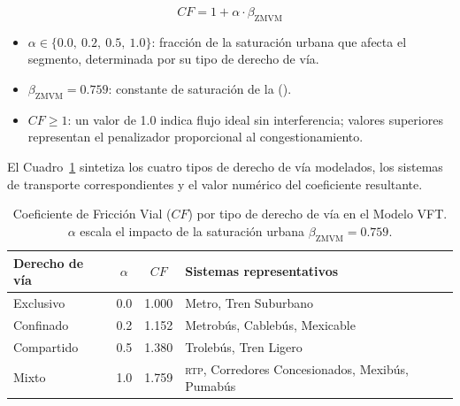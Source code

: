 \begin{equation}
    CF = 1 + \alpha \cdot \beta_{\text{ZMVM}}
    \label{eq:cf-formula}
\end{equation}

\begin{itemize}
    \item $\alpha \in \{0.0,\ 0.2,\ 0.5,\ 1.0\}$: fracción de la saturación
    urbana que afecta el segmento, determinada por su tipo de derecho de vía.
    \item $\beta_{\text{ZMVM}} = 0.759$: constante de saturación de la \zmvm
    ().
    \item $CF \geq 1$: un valor de 1.0 indica flujo ideal sin interferencia;
valores superiores representan el penalizador proporcional al congestionamiento.
\end{itemize}

El Cuadro~\ref{tab:cf-por-via} sintetiza los cuatro tipos de derecho de vía
modelados, los sistemas de transporte correspondientes y el valor numérico del
coeficiente resultante.

\begin{table}[H]
    \centering
    \caption[Coeficiente de Fricción Vial por tipo de derecho de vía]{Coeficiente
    de Fricción Vial ($CF$) por tipo de derecho de vía en el Modelo VFT.
    $\alpha$ escala el impacto de la saturación urbana
    $\beta_{\text{ZMVM}} = 0.759$.}
    \label{tab:cf-por-via}
    \begin{tabularx}{\textwidth}{|l|c|c|X|}
        \hline
        \textbf{Derecho de vía} & \textbf{$\alpha$} & \textbf{$CF$} &
        \textbf{Sistemas representativos} \\
        \hline
        Exclusivo   & 0.0 & 1.000 & Metro, Tren Suburbano \\
        Confinado   & 0.2 & 1.152 & Metrobús, Cablebús, Mexicable \\
        Compartido  & 0.5 & 1.380 & Trolebús, Tren Ligero \\
        Mixto       & 1.0 & 1.759 & \textsc{rtp}, Corredores Concesionados,
                                    Mexibús, Pumabús \\
        \hline
    \end{tabularx}
\end{table}

